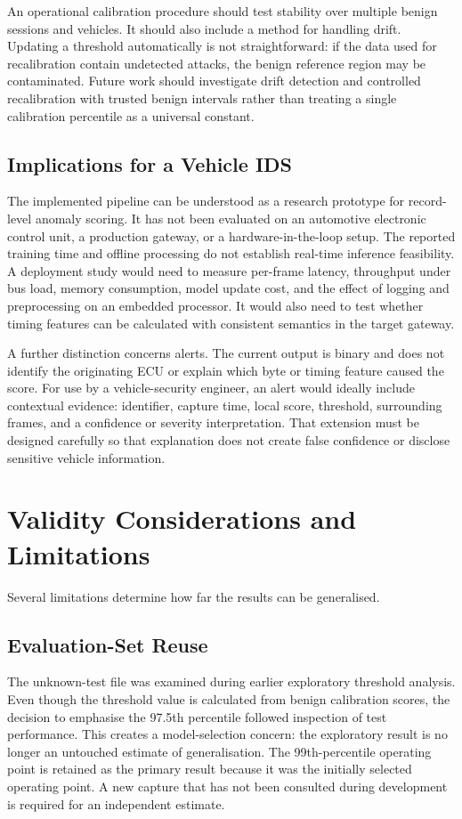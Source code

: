 \documentclass[journal]{IEEEtran}
\begin{document}
An operational calibration procedure should test stability over multiple benign sessions and vehicles. It should also include a method for handling drift. Updating a threshold automatically is not straightforward: if the data used for recalibration contain undetected attacks, the benign reference region may be contaminated. Future work should investigate drift detection and controlled recalibration with trusted benign intervals rather than treating a single calibration percentile as a universal constant.

\subsection{Implications for a Vehicle IDS}
The implemented pipeline can be understood as a research prototype for record-level anomaly scoring. It has not been evaluated on an automotive electronic control unit, a production gateway, or a hardware-in-the-loop setup. The reported training time and offline processing do not establish real-time inference feasibility. A deployment study would need to measure per-frame latency, throughput under bus load, memory consumption, model update cost, and the effect of logging and preprocessing on an embedded processor. It would also need to test whether timing features can be calculated with consistent semantics in the target gateway.

A further distinction concerns alerts. The current output is binary and does not identify the originating ECU or explain which byte or timing feature caused the score. For use by a vehicle-security engineer, an alert would ideally include contextual evidence: identifier, capture time, local score, threshold, surrounding frames, and a confidence or severity interpretation. That extension must be designed carefully so that explanation does not create false confidence or disclose sensitive vehicle information.

\section{Validity Considerations and Limitations}
Several limitations determine how far the results can be generalised.

\subsection{Evaluation-Set Reuse}
The unknown-test file was examined during earlier exploratory threshold analysis. Even though the threshold value is calculated from benign calibration scores, the decision to emphasise the 97.5th percentile followed inspection of test performance. This creates a model-selection concern: the exploratory result is no longer an untouched estimate of generalisation. The 99th-percentile operating point is retained as the primary result because it was the initially selected operating point. A new capture that has not been consulted during development is required for an independent estimate.
\end{document}
